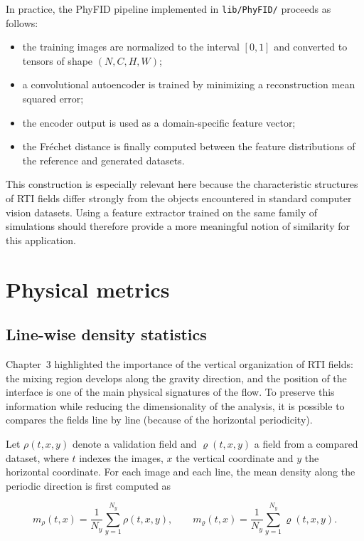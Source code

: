 In practice, the PhyFID pipeline implemented in
\texttt{lib/PhyFID/} proceeds as follows:

\begin{itemize}
    \item the training images are normalized to the interval $[0,1]$ and
    converted to tensors of shape $(N,C,H,W)$;
    \item a convolutional autoencoder is trained by minimizing a reconstruction
    mean squared error;
    \item the encoder output is used as a domain-specific feature vector;
    \item the Fr\'echet distance is finally computed between the feature
    distributions of the reference and generated datasets.
\end{itemize}

This construction is especially relevant here because the characteristic
structures of RTI fields differ strongly from the objects encountered in
standard computer vision datasets. Using a feature extractor trained on the
same family of simulations should therefore provide a more meaningful notion of
similarity for this application.


\section{Physical metrics}

\subsection{Line-wise density statistics}

Chapter~3 highlighted the importance of the vertical organization of RTI
fields: the mixing region develops along the gravity direction, and the
position of the interface is one of the main physical signatures of the flow.
To preserve this information while reducing the dimensionality of the analysis, 
it is possible to compares the fields line by line (because of the horizontal periodicity).

Let $\rho(t,x,y)$ denote a validation field and $\varrho(t,x,y)$ a field from a
compared dataset, where $t$ indexes the images, $x$ the vertical coordinate and
$y$ the horizontal coordinate. For each image and each line, the mean density
along the periodic direction is first computed as

\begin{equation}
    m_{\rho}(t,x)
    =
    \frac{1}{N_y}
    \sum_{y=1}^{N_y}\rho(t,x,y),
    \qquad
    m_{\varrho}(t,x)
    =
    \frac{1}{N_y}
    \sum_{y=1}^{N_y}\varrho(t,x,y).
\end{equation}

